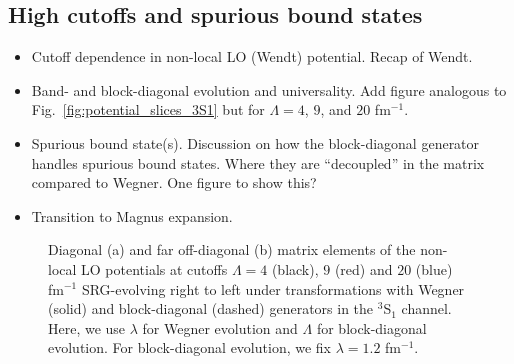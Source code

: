\documentclass[preprintnumbers,floatfix,aps,prc,preprint,nofootinbib]{revtex4-1}
\begin{document}
\subsection{High cutoffs and spurious bound states}
\label{sec:high_cutoffs}


\begin{itemize}
	\item Cutoff dependence in non-local LO (Wendt) potential. Recap of Wendt.
	\item Band- and block-diagonal evolution and universality. Add figure analogous to Fig.~\ref{fig:potential_slices_3S1} but for $\Lambda=4$, $9$, and $20$ fm$^{-1}$.
	\item Spurious bound state(s). Discussion on how the block-diagonal generator handles spurious bound states. Where they are ``decoupled'' in the matrix compared to Wegner. One figure to show this?
	\item Transition to Magnus expansion.
\end{itemize}
%
\begin{figure}[H]
	\centering
	
	\caption{Diagonal (a) and far off-diagonal (b) matrix elements of the non-local LO potentials at cutoffs $\Lambda=4$ (black), $9$ (red) and $20$ (blue) fm$^{-1}$ SRG-evolving right to left under transformations with Wegner (solid) and block-diagonal (dashed) generators in the $^3$S$_1$ channel. Here, we use $\lambda$ for Wegner evolution and $\Lambda$ for block-diagonal evolution. For block-diagonal evolution, we fix $\lambda=1.2$ fm$^{-1}$.}
	\label{fig:potential_slices_high_cutoffs}
\end{figure}
%
\end{document}
